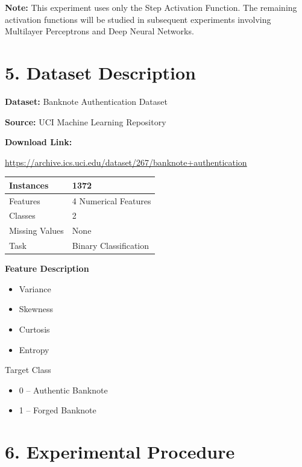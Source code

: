 \documentclass[11pt]{article}
\begin{document}
\textbf{Note:} This experiment uses only the Step Activation Function. The remaining activation functions will be studied in subsequent experiments involving Multilayer Perceptrons and Deep Neural Networks.


\section*{5. Dataset Description}

\textbf{Dataset:} Banknote Authentication Dataset

\textbf{Source:} UCI Machine Learning Repository

\textbf{Download Link:}

\url{https://archive.ics.uci.edu/dataset/267/banknote+authentication}

\begin{center}
\begin{tabular}{|l|l|}
\hline
Instances & 1372\\
\hline
Features & 4 Numerical Features\\
\hline
Classes & 2\\
\hline
Missing Values & None\\
\hline
Task & Binary Classification\\
\hline
\end{tabular}
\end{center}

\textbf{Feature Description}

\begin{itemize}
\item Variance
\item Skewness
\item Curtosis
\item Entropy
\end{itemize}

Target Class

\begin{itemize}
\item 0 -- Authentic Banknote
\item 1 -- Forged Banknote
\end{itemize}


\section*{6. Experimental Procedure}
\end{document}
